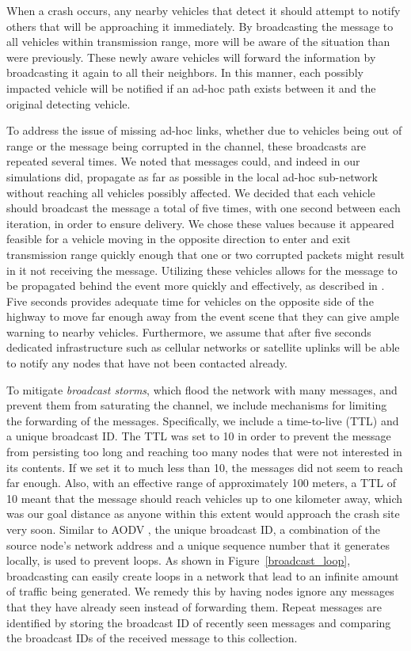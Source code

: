 \documentclass{IEEEtran}
\begin{document}
When a crash occurs, any nearby vehicles that detect it should attempt to notify others that will be approaching it immediately.
By broadcasting the message to all vehicles within transmission range, more will be aware of the situation than were previously.
These newly aware vehicles will forward the information by broadcasting it again to all their neighbors.
In this manner, each possibly impacted vehicle will be notified if an ad-hoc path exists between it and the original detecting vehicle.

To address the issue of missing ad-hoc links, whether due to vehicles being out of range or the message being corrupted in the channel, these broadcasts are repeated several times.
We noted that messages could, and indeed in our simulations did, propagate as far as possible in the local ad-hoc sub-network without reaching all vehicles possibly affected.
We decided that each vehicle should broadcast the message a total of five times, with one second between each iteration, in order to ensure delivery.
We chose these values because it appeared feasible for a vehicle moving in the opposite direction to enter and exit transmission range quickly enough that one or two corrupted packets might result in it not receiving the message.
Utilizing these vehicles allows for the message to be propagated behind the event more quickly and effectively, as described in \cite{vanet_dissem}.
Five seconds provides adequate time for vehicles on the opposite side of the highway to move far enough away from the event scene that they can give ample warning to nearby vehicles.
Furthermore, we assume that after five seconds dedicated infrastructure such as cellular networks or satellite uplinks will be able to notify any nodes that have not been contacted already.

To mitigate \emph{broadcast storms}, which flood the network with many messages, and prevent them from saturating the channel, we include mechanisms for limiting the forwarding of the messages.
Specifically, we include a time-to-live (TTL) and a unique broadcast ID.
The TTL was set to 10 in order to prevent the message from persisting too long and reaching too many nodes that were not interested in its contents.
If we set it to much less than 10, the messages did not seem to reach far enough.
Also, with an effective range of approximately 100 meters, a TTL of 10 meant that the message should reach vehicles up to one kilometer away, which was our goal distance as anyone within this extent would approach the crash site very soon.
Similar to AODV \cite{aodv}, the unique broadcast ID, a combination of the source node's network address and a unique sequence number that it generates locally, is used to prevent loops.
As shown in Figure~\ref{broadcast_loop}, broadcasting can easily create loops in a network that lead to an infinite amount of traffic being generated.
We remedy this by having nodes ignore any messages that they have already seen instead of forwarding them.
Repeat messages are identified by storing the broadcast ID of recently seen messages and comparing the broadcast IDs of the received message to this collection.
\end{document}
